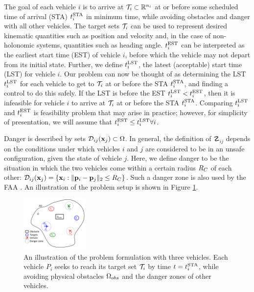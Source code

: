The goal of each vehicle $i$ is to arrive at $\mathcal{T}_i \subset \mathbb{R}^{n_i}$ at or before some scheduled time of arrival (STA) $t^{\text{STA}}_i$ in minimum time, while avoiding obstacles and danger with all other vehicles. The target sets $\mathcal{T}_i$ can be used to represent desired kinematic quantities such as position and velocity and, in the case of non-holonomic systems, quantities such as heading angle.  $t^{\text{EST}}_i$ can be interpreted as the earliest start time (EST) of vehicle $i$, before which the vehicle may not depart from its initial state. Further, we define $t^{\text{LST}}_i$, the latest (acceptable) start time (LST) for vehicle $i$. Our problem can now be thought of as determining the LST $t^{\text{LST}}_i$ for each vehicle to get to $\mathcal{T}_i$ at or before the STA $t^{\text{STA}}_i$, and finding a control to do this safely. If the LST is before the EST $t^{\text{LST}}_i < t^{\text{EST}}_i$, then it is infeasible for vehicle $i$ to arrive at $\mathcal{T}_i$ at or before the STA $t^{\text{STA}}_i$. Comparing $t^{\text{LST}}_i$ and $t^{\text{EST}}_i$ is feasibility problem that may arise in practice; however, for simplicity of presentation, we will assume that $t^{\text{EST}}_i\le t^{\text{LST}}_i \forall i$.

Danger is described by sets $\mathcal{D}_{ij}(\mathbf{x}_j) \subset \Omega$. In general, the definition of $\danger_{ij}$ depends on the conditions under which vehicles $i$ and $j$ are considered to be in an unsafe configuration, given the state of vehicle $j$. Here, we define danger to be the situation in which the two vehicles come within a certain radius $R_C$ of each other: $\mathcal{D}_{ij}(\mathbf{x}_j) = \{\mathbf{x}_i: \| \mathbf{p}_i - \mathbf{p}_j\|_2 \le R_C \}$. Such a danger zone is also used by the FAA \cite{paglione99}. An illustration of the problem setup is shown in Figure \ref{fig:formulation}.

\begin{figure}
	\centering
	\includegraphics[width=0.3\textwidth]{"fig/formulation"}
	\caption{An illustration of the problem formulation with three vehicles. Each vehicle $P_i$ seeks to reach its target set $\mathcal{T}_i$ by time $t=t^{\text{STA}}_i$, while avoiding physical obstacles $\Omega_{obs}$ and the danger zones of other vehicles.}
	\label{fig:formulation}
\end{figure}

